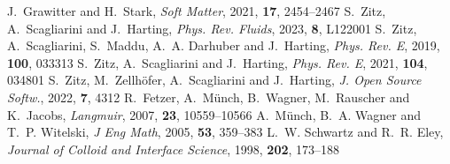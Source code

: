 \documentclass[twoside,twocolumn,9pt]{article}
\begin{document}
\begin{mcitethebibliography}{38}
J.~Grawitter and H.~Stark, \emph{Soft Matter}, 2021, \textbf{17}, 2454--2467\relax
\mciteBstWouldAddEndPuncttrue
\mciteSetBstMidEndSepPunct{\mcitedefaultmidpunct}
{\mcitedefaultendpunct}{\mcitedefaultseppunct}\relax
\EndOfBibitem
{}
S.~Zitz, A.~Scagliarini and J.~Harting, \emph{Phys. Rev. Fluids}, 2023, \textbf{8}, L122001\relax
\mciteBstWouldAddEndPuncttrue
\mciteSetBstMidEndSepPunct{\mcitedefaultmidpunct}
{\mcitedefaultendpunct}{\mcitedefaultseppunct}\relax
\EndOfBibitem
{}
S.~Zitz, A.~Scagliarini, S.~Maddu, A.~A. Darhuber and J.~Harting, \emph{Phys. Rev. E}, 2019, \textbf{100}, 033313\relax
\mciteBstWouldAddEndPuncttrue
\mciteSetBstMidEndSepPunct{\mcitedefaultmidpunct}
{\mcitedefaultendpunct}{\mcitedefaultseppunct}\relax
\EndOfBibitem
{}
S.~Zitz, A.~Scagliarini and J.~Harting, \emph{Phys. Rev. E}, 2021, \textbf{104}, 034801\relax
\mciteBstWouldAddEndPuncttrue
\mciteSetBstMidEndSepPunct{\mcitedefaultmidpunct}
{\mcitedefaultendpunct}{\mcitedefaultseppunct}\relax
\EndOfBibitem
{}
S.~Zitz, M.~Zellh{\"o}fer, A.~Scagliarini and J.~Harting, \emph{J. Open Source Softw.}, 2022, \textbf{7}, 4312\relax
\mciteBstWouldAddEndPuncttrue
\mciteSetBstMidEndSepPunct{\mcitedefaultmidpunct}
{\mcitedefaultendpunct}{\mcitedefaultseppunct}\relax
\EndOfBibitem
{}
R.~Fetzer, A.~M{\"u}nch, B.~Wagner, M.~Rauscher and K.~Jacobs, \emph{Langmuir}, 2007, \textbf{23}, 10559--10566\relax
\mciteBstWouldAddEndPuncttrue
\mciteSetBstMidEndSepPunct{\mcitedefaultmidpunct}
{\mcitedefaultendpunct}{\mcitedefaultseppunct}\relax
\EndOfBibitem
{}
A.~M{\"u}nch, B.~A. Wagner and T.~P. Witelski, \emph{J Eng Math}, 2005, \textbf{53}, 359--383\relax
\mciteBstWouldAddEndPuncttrue
\mciteSetBstMidEndSepPunct{\mcitedefaultmidpunct}
{\mcitedefaultendpunct}{\mcitedefaultseppunct}\relax
\EndOfBibitem
{}
L.~W. Schwartz and R.~R. Eley, \emph{Journal of Colloid and Interface Science}, 1998, \textbf{202}, 173--188\relax

\end{mcitethebibliography}
\end{document}
